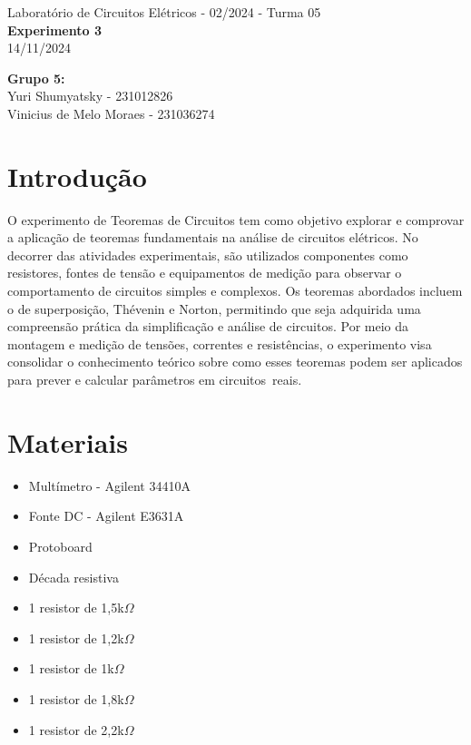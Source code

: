 \documentclass[a4 paper]{article}
\newcommand{\parag}{\hspace{30pt}}
\begin{document}
\justifying
\begin{center}{\large Laboratório de Circuitos Elétricos - 02/2024 - Turma 05}\\
{\large \textbf{Experimento 3}}\\ 
14/11/2024
\end{center}

\vspace{500pt}
 \noindent\textbf{Grupo 5:}\\
 Yuri Shumyatsky - 231012826\\
Vinicius de Melo Moraes - 231036274


\vspace{30pt}
\newpage

\section{Introdução}
\parag O experimento de Teoremas de Circuitos tem como objetivo explorar e comprovar a aplicação de teoremas fundamentais na análise de circuitos elétricos. No decorrer das atividades experimentais, são utilizados componentes como resistores, fontes de tensão e equipamentos de medição para observar o comportamento de circuitos simples e complexos. Os teoremas abordados incluem o de superposição, Thévenin e Norton, permitindo que seja adquirida uma compreensão prática da simplificação e análise de circuitos. Por meio da montagem e medição de tensões, correntes e resistências, o experimento visa consolidar o conhecimento teórico sobre como esses teoremas podem ser aplicados para prever e calcular parâmetros em circuitos reais.


\section{Materiais}
\begin{itemize}
\item Multímetro - Agilent 34410A
\item Fonte DC - Agilent E3631A
\item Protoboard
\item Década resistiva
\item 1 resistor de 1,5k$\Omega$
\item 1 resistor de 1,2k$\Omega$
\item 1 resistor de 1k$\Omega$
\item 1 resistor de 1,8k$\Omega$
\item 1 resistor de 2,2k$\Omega$
\end{itemize}
\end{document}
